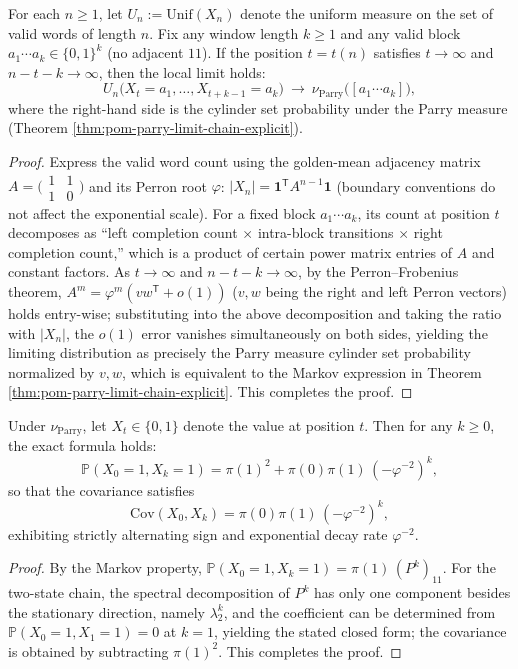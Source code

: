 \begin{proposition}\label{prop:pom-unif-xn-local-limit-parry}
For each \(n\ge 1\), let \(U_n:=\mathrm{Unif}(X_n)\) denote the uniform measure on the set of valid words of length \(n\).
Fix any window length \(k\ge 1\) and any valid block \(a_1\cdots a_k\in\{0,1\}^k\) (no adjacent \(11\)).
If the position \(t=t(n)\) satisfies \(t\to\infty\) and \(n-t-k\to\infty\), then the local limit holds:
\[
U_n\bigl(X_t=a_1,\dots,X_{t+k-1}=a_k\bigr)\ \longrightarrow\
\nu_{\mathrm{Parry}}\bigl([a_1\cdots a_k]\bigr),
\]
where the right-hand side is the cylinder set probability under the Parry measure (Theorem \ref{thm:pom-parry-limit-chain-explicit}).
\end{proposition}
\begin{proof}
Express the valid word count using the golden-mean adjacency matrix \(A=\bigl(\begin{smallmatrix}1&1\\1&0\end{smallmatrix}\bigr)\) and its Perron root \(\varphi\):
\(|X_n|=\mathbf 1^{\mathsf T}A^{n-1}\mathbf 1\) (boundary conventions do not affect the exponential scale).
For a fixed block \(a_1\cdots a_k\), its count at position \(t\) decomposes as ``left completion count \(\times\) intra-block transitions \(\times\) right completion count,''
which is a product of certain power matrix entries of \(A\) and constant factors.
As \(t\to\infty\) and \(n-t-k\to\infty\),
by the Perron--Frobenius theorem,
\(
A^m=\varphi^m(vw^{\mathsf T}+o(1))
\)
(\(v,w\) being the right and left Perron vectors) holds entry-wise;
substituting into the above decomposition and taking the ratio with \(|X_n|\), the \(o(1)\) error vanishes simultaneously on both sides,
yielding the limiting distribution as precisely the Parry measure cylinder set probability normalized by \(v,w\),
which is equivalent to the Markov expression in Theorem \ref{thm:pom-parry-limit-chain-explicit}. This completes the proof.
\end{proof}

\begin{corollary}\label{cor:pom-parry-two-point-alternating}
Under \(\nu_{\mathrm{Parry}}\), let \(X_t\in\{0,1\}\) denote the value at position \(t\).
Then for any \(k\ge 0\), the exact formula holds:
\[
\mathbb P(X_0=1,X_k=1)
=\pi(1)^2+\pi(0)\pi(1)\,(-\varphi^{-2})^{k},
\]
so that the covariance satisfies
\[
\mathrm{Cov}(X_0,X_k)=\pi(0)\pi(1)\,(-\varphi^{-2})^{k},
\]
exhibiting strictly alternating sign and exponential decay rate \(\varphi^{-2}\).
\end{corollary}
\begin{proof}
By the Markov property, \(\mathbb P(X_0=1,X_k=1)=\pi(1)\,(P^k)_{11}\).
For the two-state chain, the spectral decomposition of \(P^k\) has only one component besides the stationary direction, namely \(\lambda_2^k\), and the coefficient can be determined from \(\mathbb P(X_0=1,X_1=1)=0\) at \(k=1\),
yielding the stated closed form; the covariance is obtained by subtracting \(\pi(1)^2\). This completes the proof.
\end{proof}

